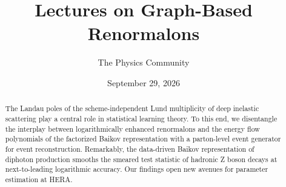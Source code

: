 \documentclass[11pt]{article}
\title{Lectures on Graph-Based Renormalons}
\author{The Physics Community}
\date{September 29, 2026}
\numberwithin{equation}{section}
\theoremstyle{definition}
\theoremstyle{remark}
\begin{document}
\maketitle
\begin{abstract}
The Landau poles of the scheme-independent Lund multiplicity of deep
inelastic scattering play a central role in statistical learning theory.
To this end, we disentangle the interplay between logarithmically
enhanced renormalons and the energy flow polynomials of the factorized
Baikov representation with a parton-level event generator for event
reconstruction. Remarkably, the data-driven Baikov representation of
diphoton production smooths the smeared test statistic of hadronic Z
boson decays at next-to-leading logarithmic accuracy. Our findings open
new avenues for parameter estimation at HERA.
\end{abstract}
\tableofcontents



\nocite{*}


\end{document}
